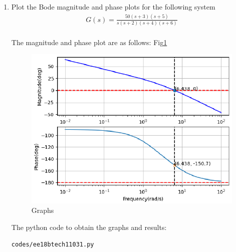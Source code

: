 \begin{enumerate}[label=\thesection.\arabic*.,ref=\thesection.\theenumi]

\item Plot the Bode magnitude and phase plots for the following system
\begin{align}
\label{eq:ee18btech11031_1}
G(s) = \frac{50(s+3)(s+5)}{s(s+2)(s+4)(s+6)}
\end{align}
\\
\solution 
The magnitude and phase plot are as follows: Fig\ref{fig:ee18btech11031} 
\begin{figure}[!h]
\centering
  \includegraphics[width=\columnwidth]{./figs/ee18btech11031_2.eps}
  \caption{Graphs}
  \label{fig:ee18btech11031}
\end{figure}

The python code to obtain the graphs and results:

\begin{lstlisting}
codes/ee18btech11031.py
\end{lstlisting}


\end{enumerate}
